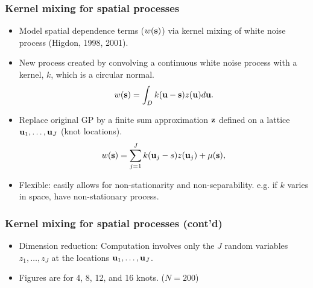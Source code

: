 \documentclass{beamer}
\begin{document}
\begin{frame}
  \frametitle{Kernel mixing for spatial processes  }
    \begin{itemize}
    \item Model spatial dependence terms ($w({\bf s})$) via kernel
      mixing of white noise process (Higdon, 1998, 2001).
    \item New process created by convolving a continuous white noise
      process with a kernel, $k$, which is a circular normal.
\begin{equation*}\label{eq:cntnwhite}
  w ({\bf s})=\int_D k({\bf u}-{\bf s})z({\bf u}) d{\bf u}.
\end{equation*}
\item Replace original GP by a finite sum approximation ${\bf z}$ defined on a lattice ${\bf u}_1,\dots,{\bf u}_J$ (knot locations).
\begin{equation*}
  w ({\bf s})=\sum_{j=1}^J k({\bf u}_j-s) z({\bf u}_j) + \mu({\bf s}),
\end{equation*}
\item Flexible: easily allows for non-stationarity and
  non-separability. e.g. if $k$ varies in space, have non-stationary process.
\end{itemize}
\end{frame}


\begin{frame}
  \frametitle{Kernel mixing for spatial processes (cont'd)  }
    \begin{itemize}    
\item Dimension reduction: Computation involves only the $J$ random variables $z_1,\dots,z_J$ at the locations ${\bf u}_1,\dots,{\bf u}_J$.
\item Figures are for 4, 8, 12, and 16 knots. ($N=200$) %
\end{itemize}
\end{frame}
\end{document}
